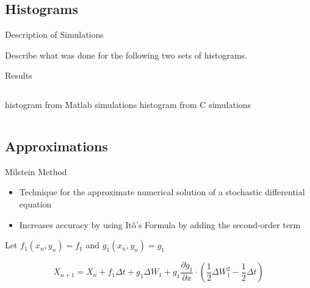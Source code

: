 
\subsection{Histograms}

\begin{frame}{Description of Simulations}

  Describe what was done for the following two sets of histograms.

\end{frame}


\begin{frame}{Results}
 

  \begin{columns}[t]
    histogram from Matlab simulations
    histogram from C simulations
  \end{columns}


\end{frame}



\subsection{Approximations}

\begin{frame}{Milstein Method}

	\begin{itemize}
		\item Technique for the approximate numerical solution of a stochastic differential equation
		\item Increases accuracy by using It\^o's Formula by adding the second-order term
	\end{itemize} 
	
	\vfill
	
Let $f_1(x_n,y_n) = f_1$ and $g_1(x_n,y_n) = g_1$

		$$X_{n+1} = X_n + f_1\Delta t + g_1 \Delta W_1 + g_1 \frac{\partial g_1}{\partial x}  \cdot \left(\frac{1}{2} \Delta W_1 ^2 - \frac{1}{2} \Delta t \right)$$
	
	\vfill

\end{frame}

